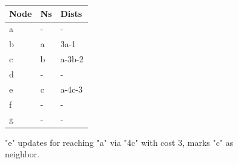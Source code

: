 \documentclass[12pt, oneandhalf, chaparabic, sees, ms]{metu}
\begin{document}
\begin{center}
\begin{figure}[!htp]
\begin{center}
\begin{minipage}{0.3\textwidth}
    \begin{tabular}{ | l | l | l | }
    \hline
    \rowcolor{lightgray}
    Node & Ns & Dists \\ \hline \hline
    a    & -  & -     \\ \hline
    b    & a  & 3a-1   \\ \hline
    c    & b  & a-3b-2 \\ \hline
    d    & -  & -     \\ \hline
     \rowcolor{black!50}
    e    & c  & a-4c-3 \\ \hline
    f    & -  & -     \\ \hline
    g    & -  & -     \\
    \hline
   \end{tabular}
   \end{minipage}
   
   \end{center}
    \caption{"e" updates for reaching "a" via "4c" with cost 3, marks "c" as neighbor.}
    \label{fig:lagoon-graph4d}
  \end{figure}
\end{center}
 
 
 
 
 
 
 
\end{document}
